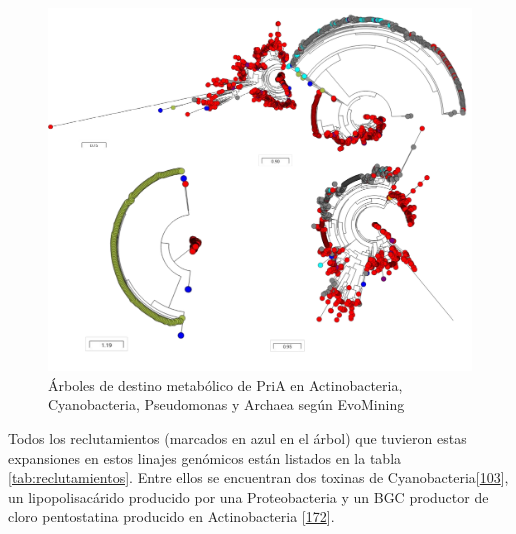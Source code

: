 \documentclass[12pt,twoside]{reedthesis}
\begin{document}
  \begin{figure}[h!tbp]
  \centering
  \includegraphics[angle = 0,scale = 0.8]{chapter4/PriAEvoMining.pdf}
  \caption[Árboles de destino metabólico de PriA en Actinobacteria, Cyanobacteria, {Pseudomonas} y Archaea según EvoMining]{\footnotesize{Árboles de destino metabólico de PriA en Actinobacteria, Cyanobacteria, {Pseudomonas} y Archaea según EvoMining}}
  \label{fig:PriATrees}
  \end{figure}
  
  Todos los reclutamientos (marcados en azul en el árbol) que tuvieron
  estas expansiones en estos linajes genómicos están listados en la tabla
  \autoref{tab:reclutamientos}. Entre ellos se encuentran dos toxinas de
  Cyanobacteria{[}\protect\hyperlink{ref-moustafa_origin_2009}{103}{]}, un
  lipopolisacárido producido por una Proteobacteria y un BGC productor de
  cloro pentostatina producido en Actinobacteria
  {[}\protect\hyperlink{ref-gao_biosynthesis_2017}{172}{]}.
  
\end{document}
